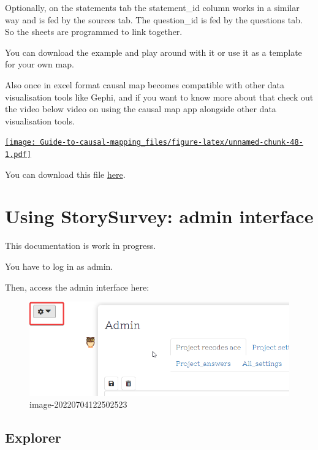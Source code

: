 \documentclass[
]{book}
\begin{document}
Optionally, on the statements tab the statement\_id column works in a similar way and is fed by the sources tab. The question\_id is fed by the questions tab. So the sheets are programmed to link together.

You can download the example and play around with it or use it as a template for your own map.

Also once in excel format causal map becomes compatible with other data visualisation tools like Gephi, and if you want to know more about that check out the video below video on using the causal map app alongside other data visualisation tools.

\href{https://player.vimeo.com/video/599620015}{\texttt{[image: Guide-to-causal-mapping\_files/figure-latex/unnamed-chunk-48-1.pdf]}}

You can download this file \href{https://docs.google.com/spreadsheets/d/12eXQDJtvlLO6qRrwbxwvkchfdTNLSbjo/edit?usp=sharing\&ouid=112812082380437768869\&rtpof=true\&sd=true}{here}.

\hypertarget{using-storysurvey-admin-interface}{%
\chapter{Using StorySurvey: admin interface}\label{using-storysurvey-admin-interface}}

This documentation is work in progress.

You have to log in as admin.

Then, access the admin interface here:

\begin{figure}
\centering
\includegraphics{_assets/image-20220704122502523.png}
\caption{image-20220704122502523}
\end{figure}

\hypertarget{explorer}{%
\section{Explorer}\label{explorer}}
\end{document}
